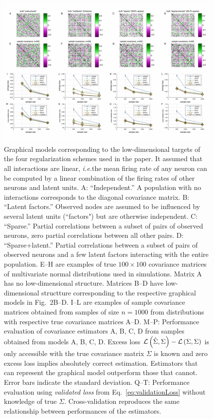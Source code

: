 \begin{figure}[htp]
\centering
\includegraphics[width=1.0\textwidth]{figures/Figure3.pdf}
\caption{
Graphical models corresponding to the low-dimensional targets of the four regularization schemes used in the paper. It assumed that all interactions are linear, \emph{i.e.}\;the mean firing rate of any neuron can be computed by a linear combination of the firing rates of other neurons and latent units.
\textsf{A}: ``Independent.'' A population with no interactions corresponds to the diagonal covariance matrix.
\textsf{B}: ``Latent factors.'' Observed nodes are assumed to be influenced by several latent units (``factors") but are otherwise independent.
\textsf{C}: ``Sparse.'' Partial correlations between a subset of pairs of observed neurons, zero partial correlations between all other pairs.  
\textsf{D}: ``Sparse+latent.''  Partial correlations between a subset of pairs of observed neurons and a few latent factors interacting with the entire population. 
{\sf E--H} are examples of true $100\times100$ covariance matrices of multivariate normal distributions used in simulations. Matrix A has no low-dimensional structure. Matrices B--D have low-dimensional structture corresponding to the respective graphical models in Fig.~2B--D.
{\sf I--L} are examples of sample covariance matrices obtained from samples of size $n=1000$ from distributions with respective true covariance matrices A--D.
{\sf M--P:} Performance evaluation of covariance estimators A, B, C, D from samples obtained from models A, B, C, D.  Excess loss $\mathcal L\left(\hat\Sigma,\Sigma\right)-\mathcal L\left(\Sigma,\Sigma\right)$ is only accessible with the true covariance matrix $\Sigma$ is known and zero excess loss implies absolutely correct estimation. Estimators that can represent the graphical model outperform those that cannot.  Error bars indicate the standard deviation. 
{\sf Q--T:} Performance evaluation using \emph{validated loss} from Eq.~\ref{eq:validationLoss} without knowledge of true $\Sigma$. Cross-validation reproduces the same relationship between performances of the estimators.
}\label{fig:03}
\end{figure}